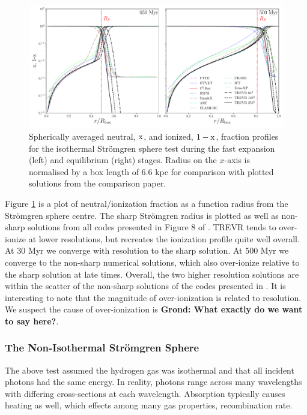 \documentclass[fleq,usenatbib]{mnras}
\newcommand{\acro}{TREVR}
\newcommand{\comment}[1]{\textbf{\color{red}#1}}
\newcommand{\strom}{Str\"omgren}
\begin{document}
\begin{figure}
\includegraphics[width=0.95\linewidth]{Figures/strom_iso_fraction.pdf}
\caption{Spherically averaged neutral, $\rm x$, and ionized, $\rm 1-x$, 
fraction profiles for the isothermal \strom{} sphere test during the fast 
expansion (left) and equilibrium (right) stages. Radius on the $x$-axis is 
normalised by a box length of 6.6 kpc for comparison with plotted solutions 
from the \protect\cite{ilievEt06} comparison paper.}
\label{fig:stromiso}
\end{figure}
Figure \ref{fig:stromiso} is a plot of neutral/ionization fraction as a 
function radius from the \strom{} sphere centre. The sharp \strom{} radius is 
plotted as well as non-sharp solutions from all codes presented in Figure 8 
of \cite{ilievEt06}. \acro{} tends to over-ionize at lower resolutions, but 
recreates the ionization profile quite well overall. At 30 Myr we converge 
with resolution to the sharp solution. At 500 Myr we converge to the non-sharp 
numerical solutions, which also over-ionize relative to the sharp solution at 
late times. Overall, the two higher resolution solutions are within the 
scatter of the non-sharp solutions of the codes presented in \cite{ilievEt06}. 
It is interesting to note that the magnitude of over-ionization is related to 
resolution. We suspect the cause of over-ionization is \comment{Grond: What 
exactly do we want to say here?}.

\subsubsection{The Non-Isothermal \strom{} Sphere}
The above test assumed the hydrogen gas was isothermal and that all incident 
photons had the same energy. In reality, photons range across many wavelengths 
with differing cross-sections at each wavelength. Absorption typically causes 
heating as well, which effects among many gas properties, recombination rate.
\end{document}
